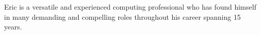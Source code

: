 

\begin{cvparagraph}

Eric is a versatile and experienced computing professional who has found himself in many demanding and compelling roles throughout his career spanning 15 years. 
\end{cvparagraph}

